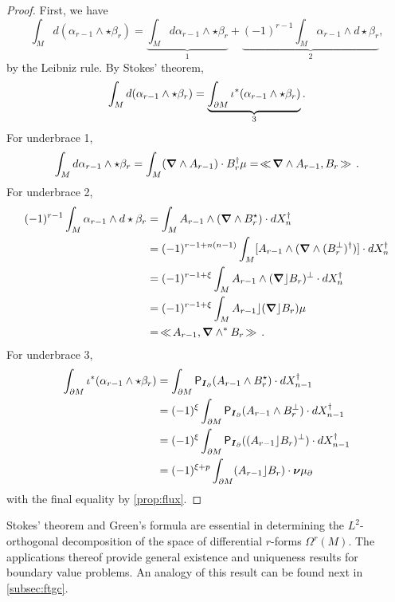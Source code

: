 \begin{proof}
First, we have
\begin{equation}
\int_M d(\alpha_{r-1} \wedge \star \beta_r) = \underbrace{\int_M d\alpha_{r-1} \wedge \star \beta_r}_{1} + \underbrace{(-1)^{r-1} \int_M \alpha_{r-1} \wedge d \star \beta_r}_{2},
\end{equation} 
by the Leibniz rule. By Stokes' theorem,
\begin{equation}
\int_M d(\alpha_{r-1} \wedge \star \beta_r) = \underbrace{\int_{\partial M} \iota^*(\alpha_{r-1} \wedge \star \beta_r)}_{3}.
\end{equation}
For underbrace 1,
\begin{equation}
\int_M d\alpha_{r-1} \wedge \star \beta_r = \int_M (\boldsymbol{\nabla} \wedge A_{r-1}) \cdot B_r^\dagger \mu = \hspace*{.5mm}\ll \hspace*{-.5mm} \boldsymbol{\nabla} \wedge A_{r-1}, B_r \hspace*{-.5mm}\gg \hspace*{.5mm}.
\end{equation}
For underbrace 2,
\begin{align}
    (-1)^{r-1}\int_M \alpha_{r-1} \wedge d \star \beta_r  &= \int_M A_{r-1} \wedge (\boldsymbol{\nabla} \wedge B_r^\star) \cdot dX_n^\dagger\\
    &= (-1)^{r-1+n(n-1)} \int_M [A_{r-1} \wedge (\boldsymbol{\nabla} \wedge (B_r^\perp)^\dagger)] \cdot dX_n^\dagger\\
    &= (-1)^{r-1 + \xi} \int_M A_{r-1} \wedge (\boldsymbol{\nabla} \rfloor B_r)^\perp \cdot dX_n^\dagger\\
    &= (-1)^{r-1 + \xi} \int_M A_{r-1} \rfloor (\boldsymbol{\nabla} \rfloor B_r) \mu\\
    &= \hspace*{.5mm}\ll \hspace*{-.5mm} A_{r-1}, \boldsymbol{\nabla} \wedge^* B_r \hspace*{-.5mm}\gg \hspace*{.5mm}.
\end{align}
For underbrace 3,
\begin{align}
\int_{\partial M} \iota^*(\alpha_{r-1} \wedge \star \beta_r) &= \int_{\partial M} \mathsf{P}_{\boldsymbol{I}_\partial} (A_{r-1} \wedge B_r^\star) \cdot dX_{n-1}^\dagger\\
&= (-1)^{\xi} \int_{\partial M} \mathsf{P}_{\boldsymbol{I}_\partial} (A_{r-1} \wedge B_r^\perp) \cdot dX_{n-1}^\dagger\\
&= (-1)^{\xi} \int_{\partial M} \mathsf{P}_{\boldsymbol{I}_\partial}( (A_{r-1} \rfloor B_r)^\perp) \cdot dX_{n-1}^\dagger\\
&= (-1)^{\xi+p} \int_{\partial M} (A_{r-1}\rfloor B_r) \cdot \boldsymbol{\nu} \mu_\partial 
\end{align}
with the final equality by \cref{prop:flux}.
\end{proof}
Stokes' theorem and Green's formula are essential in determining the $L^2$-orthogonal decomposition of the space of differential $r$-forms $\Omega^r(M)$. The applications thereof provide general existence and uniqueness results for boundary value problems. An analogy of this result can be found next in \cref{subsec:ftgc}. 

